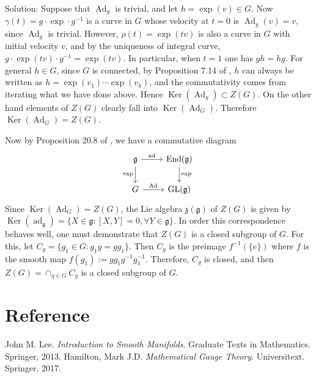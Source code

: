Solution: Suppose that $\operatorname{Ad}_g$ is trivial, and let
$h=\operatorname{exp}(v)\in G$.
Now $\gamma(t)=g\cdot \operatorname{exp}\cdot g^{-1}$
is a curve in $G$ whose velocity at $t=0$ is $\operatorname{Ad}_g(v)=v$,
since $\operatorname{Ad}_g$ is trivial. However, $\rho(t)=\operatorname{exp}(tv)$
is also a curve in $G$ with initial velocity $v$, and by the
uniqueness of integral curve,
$g\cdot \operatorname{exp}(tv)\cdot g^{-1}=\operatorname{exp}(tv)$.
In particular, when $t=1$ one has $gh=hg$. For general $h\in G$,
since $G$ is connected, by Proposition 7.14 of \cite{Lee},
$h$ can always be written as
$h=\operatorname{exp}(v_1)\cdots\operatorname{exp}(v_k)$, 
and the commutativity comes from iterating what we have done above. 
Hence $\operatorname{Ker}(\operatorname{Ad}_g)\subset Z(G)$. 
On the other hand elements of $Z(G)$ clearly fall into
$\operatorname{Ker}(\operatorname{Ad}_G)$. Therefore
$\operatorname{Ker}(\operatorname{Ad}_G)=Z(G)$.

Now by Proposition 20.8 of \cite{Lee}, we have a commutative diagram
\begin{equation*}
    \begin{tikzcd}
        \mathfrak{g} \arrow[r, "\operatorname{ad}"] \arrow[d, "\operatorname{exp}"']
        & \operatorname{End}(\mathfrak{g}) \arrow[d, "\operatorname{exp}"]
        \\
        G \arrow[r, "\operatorname{Ad}"]
        & \operatorname{GL}(\mathfrak{g})
    \end{tikzcd}
\end{equation*}
Since $\operatorname{Ker}(\operatorname{Ad}_G)=Z(G)$,
the Lie algebra $\mathfrak{z}(\mathfrak{g})$ of $Z(G)$
is given by
$\operatorname{Ker}(\operatorname{ad}_\mathfrak{g})
=\{ X\in \mathfrak{g}: [X,Y]=0, \forall Y\in \mathfrak{g}\}.$
In order this correspondence behaves well, one must demonstrate that $Z(G)$
is a closed subgroup of $G$. For this, let
$C_g=\{g_1\in G:g_1 g=gg_1\}$. Then $C_g$ is the preimage
$f^{-1}(\{e\})$ where $f$ is the smooth map $f(g_1):=gg_1 g^{-1}g_1^{-1}$.
Therefore, $C_g$ is closed, and then $Z(G)=\cap_{g\in G} C_g$
is a closed subgroup of $G$.

\section*{Reference}
\begin{references}
        John M. Lee. \textit{Introduction to Smooth Manifolds}.
        Graduate Texts in Mathematics. Springer, 2013.
        Hamilton, Mark J.D. \textit{Mathematical Gauge Theory}.
        Universitext. Springer, 2017.
\end{references}